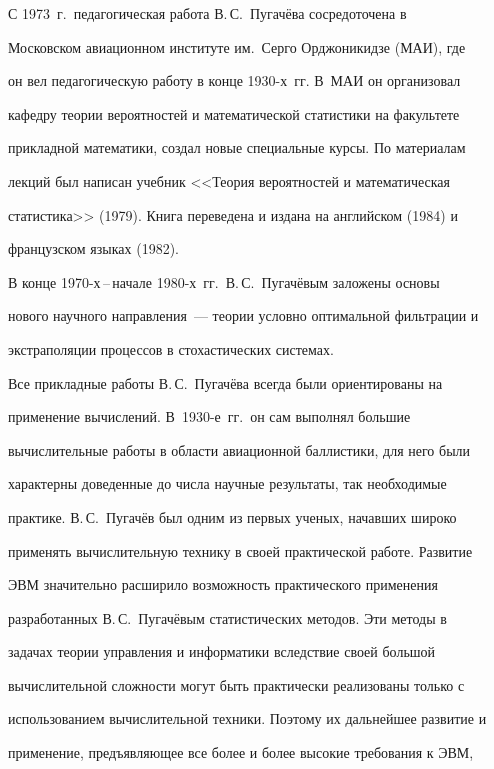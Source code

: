      С 1973~г.\ педагогическая работа В.\,С.~Пугачёва сосредоточена в 


Московском авиационном институте им.\ Серго Орджоникидзе (МАИ), где 


он вел педагогическую работу в конце 1930-х~гг. В~МАИ он организовал 


кафедру теории вероятностей и математической статистики на факультете 


прикладной математики, создал новые специальные курсы. По материалам 


лекций был написан учебник <<Теория вероятностей и математическая 


статистика>> (1979). Книга переведена и издана на английском (1984) и 


французском языках (1982).


     


     В конце 1970-х\,--\,начале 1980-х~гг.\ В.\,С.~Пугачёвым заложены основы 


нового научного направления~--- теории условно оптимальной фильтрации и 


экстраполяции процессов в стохастических системах.


     


     Все прикладные работы В.\,С.~Пугачёва всегда были ориентированы на 


применение вычислений. В~1930-е~гг.\ он сам выполнял большие 


вычислительные работы в области авиационной баллистики, для него были 


характерны доведенные до числа научные результаты, так необходимые 


практике. В.\,С.~Пугачёв был одним из первых ученых, начавших широко 


применять вычислительную технику в своей практической работе. Развитие 


ЭВМ значительно расширило возможность практического применения 


разработанных В.\,С.~Пугачёвым статистических методов. Эти методы в 


задачах теории управления и информатики вследствие своей большой 


вычислительной сложности могут быть практически реализованы только с 


использованием вычислительной техники. Поэтому их дальнейшее развитие и 


применение, предъявляющее все более и более высокие требования к ЭВМ, 


